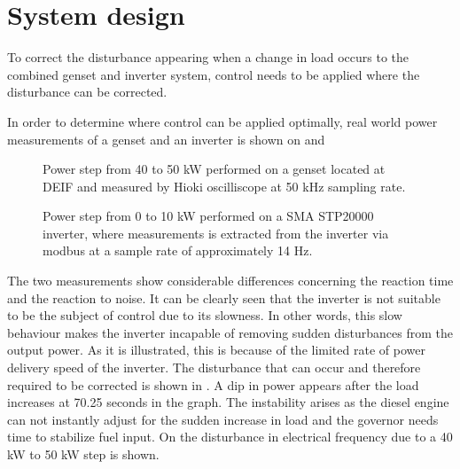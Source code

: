 \chapter{System design}
\label{System_design}


To correct the disturbance appearing when a change in load occurs to the combined genset and inverter system, control needs to be applied where the disturbance can be corrected.

In order to determine where control can be applied optimally, real world power measurements of a genset and an inverter is shown on  and 


\begin{figure}[H]
\centering

\caption{Power step from 40 to 50 kW performed on a genset located at DEIF and measured by Hioki oscilliscope at 50 kHz sampling rate.}
\label{fig:gensetPowermeas}
\end{figure}

\begin{figure}[H]
\centering

\caption{Power step from 0 to 10 kW performed on a SMA STP20000 inverter, where measurements is extracted from the inverter via modbus at a sample rate of approximately 14 Hz.}
\label{fig:inverter10kwstep}
\end{figure}


The two measurements show considerable differences concerning the reaction time and the reaction to noise. It can be clearly seen that the inverter is not suitable to be the subject of control due to its slowness. In other words, this slow behaviour makes the inverter incapable of removing sudden disturbances from the output power. As it is illustrated, this is because of the limited rate of power delivery speed of the inverter. 
The disturbance that can occur and therefore required to be corrected is shown in . A dip in power appears after the load increases at 70.25 seconds in the graph. The instability arises as the diesel engine can not instantly adjust for the sudden increase in load and the governor needs time to stabilize fuel input. On  the disturbance in electrical frequency due to a 40 kW to 50 kW step is shown.

